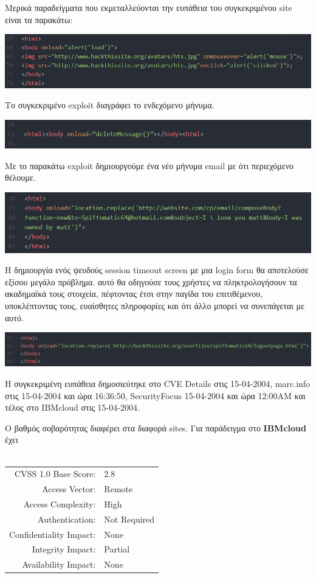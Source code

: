 \noindent
Μερικά παραδείγματα που εκμεταλλεύονται την ευπάθεια του συγκεκριμένου site είναι τα παρακάτω: 
\begin{center}
			\includegraphics[width=1\textwidth]{image/23.PNG}		
\end{center}
\noindent
Το συγκεκριμένο exploit διαγράφει το ενδεχόμενο μήνυμα.
\begin{center}
			\includegraphics[width=1\textwidth]{image/24.PNG}		
\end{center}
\noindent
Με το παρακάτω exploit δημιουργούμε ένα νέο μήνυμα email με ότι περιεχόμενο θέλουμε.
\begin{center}
			\includegraphics[width=1\textwidth]{image/25.PNG}		
\end{center}
\noindent
Η δημιουργία ενός ψευδούς session timeout screen με μια login form θα αποτελούσε εξίσου μεγάλο πρόβλημα. αυτό θα οδηγούσε τους χρήστες να πληκτρολογήσουν τα ακαδημαϊκά τους στοιχεία, πέφτοντας έτσι στην παγίδα του επιτιθέμενου, υποκλέπτοντας τους, ευαίσθητες πληροφορίες και ότι άλλο μπορεί να συνεπάγεται με αυτό.
\begin{center}
			\includegraphics[width=1\textwidth]{image/26.PNG}		
\end{center}
\noindent
Η συγκεκριμένη ευπάθεια δημοσιεύτηκε στο CVE Details στις 15-04-2004, marc.info στις 15-04-2004 και ώρα 16:36:50, SecurityFocus 15-04-2004 και ώρα 12:00ΑΜ και τέλος  στο ΙΒΜcloud στις 15-04-2004. 

\noindent
Ο βαθμός σοβαρότητας διαφέρει στα διαφορά sites. Για παράδειγμα στο \textbf{ΙΒΜcloud} έχει 
\\
\\
\begin{tabular}{rl}
\hline
CVSS 1.0 Base Score: & 2.8 \\
Access Vector: 	& Remote \\
Access Complexity: &	High \\ 
Authentication: & Not Required \\
Confidentiality Impact: & None \\
Integrity Impact: & Partial \\ 
Availability Impact: & None \\
\hline
\end{tabular}


